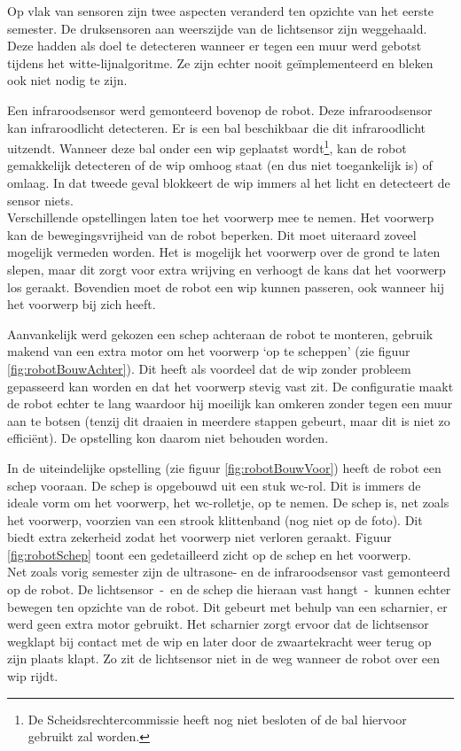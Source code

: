 \documentclass[tt2]{penoverslag}
\begin{document}
Op vlak van sensoren zijn twee aspecten veranderd ten opzichte van het eerste semester. De druksensoren aan weerszijde van de lichtsensor zijn weggehaald. Deze hadden als doel te detecteren wanneer er tegen een muur werd gebotst tijdens het witte-lijnalgoritme. Ze zijn echter nooit ge\"implementeerd en bleken ook niet nodig te zijn.

Een infraroodsensor werd gemonteerd bovenop de robot. Deze infraroodsensor kan infraroodlicht detecteren. Er is een bal beschikbaar die dit infraroodlicht uitzendt. Wanneer deze bal onder een wip geplaatst wordt\footnote{De Scheidsrechtercommissie heeft nog niet besloten of de bal hiervoor gebruikt zal worden.}, kan de robot gemakkelijk detecteren of de wip omhoog staat (en dus niet toegankelijk is) of omlaag. In dat tweede geval blokkeert de wip immers al het licht en detecteert de sensor niets.\\

Verschillende opstellingen laten toe het voorwerp mee te nemen. Het voorwerp kan de bewegingsvrijheid van de robot beperken. Dit moet uiteraard zoveel mogelijk vermeden worden. Het is mogelijk het voorwerp over de grond te laten slepen, maar dit zorgt voor extra wrijving en verhoogt de kans dat het voorwerp los geraakt. Bovendien moet de robot een wip kunnen passeren, ook wanneer hij het voorwerp bij zich heeft. 
 
Aanvankelijk werd gekozen een schep achteraan de robot te monteren, gebruik makend van een extra motor om het voorwerp `op te scheppen' (zie figuur \ref{fig:robotBouwAchter}). Dit heeft als voordeel dat de wip zonder probleem gepasseerd kan worden en dat het voorwerp stevig vast zit. De configuratie maakt de robot echter te lang waardoor hij moeilijk kan omkeren zonder tegen een muur aan te botsen (tenzij dit draaien in meerdere stappen gebeurt, maar dit is niet zo effici\"ent). De opstelling kon daarom niet behouden worden.

In de uiteindelijke opstelling (zie figuur \ref{fig:robotBouwVoor}) heeft de robot een schep vooraan. De schep is opgebouwd uit een stuk wc-rol. Dit is immers de ideale vorm om het voorwerp, het wc-rolletje, op te nemen. De schep is, net zoals het voorwerp, voorzien van een strook klittenband (nog niet op de foto). Dit biedt extra zekerheid zodat het voorwerp niet verloren geraakt. Figuur \ref{fig:robotSchep} toont een gedetailleerd zicht op de schep en het voorwerp.\\

Net zoals vorig semester zijn de ultrasone- en de infraroodsensor vast gemonteerd op de robot. De lichtsensor~-~en de schep die hieraan vast hangt~-~kunnen echter bewegen ten opzichte van de robot. Dit gebeurt met behulp van een scharnier, er werd geen extra motor gebruikt. Het scharnier zorgt ervoor dat de lichtsensor wegklapt bij contact met de wip en later door de zwaartekracht weer terug op zijn plaats klapt. Zo zit de lichtsensor niet in de weg wanneer de robot over een wip rijdt.
\end{document}
